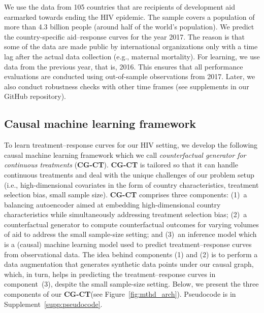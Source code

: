 \documentclass[sigconf]{acmart}
\newcommand{\framework}{\textbf{\mbox{CG-CT}}\xspace}
\newcommand{\frameworklong}{counterfactual generator for continuous treatments\xspace}
\begin{document}
We use the data from 105 countries that are recipients of development aid earmarked towards ending the HIV epidemic. The sample covers a population of more than 4.3 billion people (around half of the world's population). %
We predict the country-specific aid--response curves for the year 2017. The reason is that some of the data are made public by international organizations only with a time lag after the actual data collection (e.g., maternal mortality). For learning, we use data from the previous year, that is, 2016. This ensures that all performance evaluations are conducted using out-of-sample observations from 2017. Later, we also conduct robustness checks with other time frames (see supplements in our GitHub repository). 

\subsection{Causal machine learning framework}

To learn treatment--response curves for our HIV setting, we develop the following causal machine learning framework which we call \emph{\frameworklong}  (\framework). \framework is tailored so that it can handle continuous treatments and deal with the unique challenges of our problem setup (i.e., high-dimensional covariates in the form of country characteristics, treatment selection bias, small sample size). \framework comprises three components: (1)~a balancing autoencoder aimed at embedding high-dimensional country characteristics while simultaneously addressing treatment selection bias; (2)~a counterfactual generator to compute counterfactual outcomes for varying volumes of aid to address the small sample-size setting; and (3)~an inference model which is a (causal) machine learning model used to predict treatment--response curves from observational data. The idea behind components (1) and (2) is to perform a data augmentation that generates synthetic data points under our causal graph, which, in turn, helps in predicting the treatment--response curves in component~(3), despite the small sample-size setting. Below, we present the three components of our \framework (see Figure~\ref{fig:mthd_arch}). Pseudocode is in Supplement~\ref{supp:pseudocode}.
\end{document}
